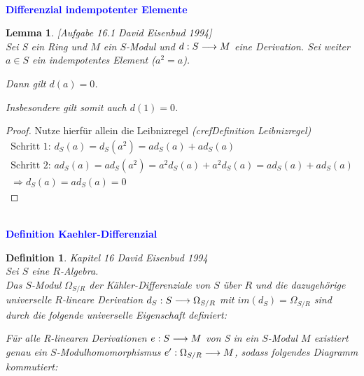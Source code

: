 \documentclass[10pt,a4paper]{report}
\newcommand{\ModulsOfDifferenzials}{David Eisenbud 1994}
\newcounter{Aussage}[chapter]
\newtheorem{lemma}[Aussage]{Lemma}
\newtheorem{definition}[Aussage]{Definition}
\newcommand{\functionfront}[3]{\nolinebreak{#1:#2 \longrightarrow #3}}
\newcommand{\divR}[2]{\Omega_{#1/#2}}
\newcommand{\divf}[1]{d_{#1}}
\newcommand{\immage}[1]{im(#1)}
\begin{document}
\ \\
\textcolor{blue}{\textbf{Differenzial indempotenter Elemente}}
\begin{lemma}\label{Differenzial indempotenter Elemente} \textit{[Aufgabe 16.1 \ModulsOfDifferenzials]} \\
Sei S ein Ring und $M$ ein $S$-Modul und $\functionfront{d}{S}{M}$ eine Derivation. Sei weiter $a \in S$ ein indempotentes Element ($a^2 = a$).
\begin{center}
Dann gilt $d(a) = 0$. 
\end{center}
Insbesondere gilt somit auch $d(1) = 0$.
\end{lemma}
\begin{proof}
Nutze hierfür allein die Leibnizregel \textit{(cref{Definition Leibnizregel})}
\begin{gather*}
\text{Schritt 1: } \divf{S}(a) = \divf{S}(a^2) = a\divf{S}(a) + a\divf{S}(a) \\
\text{Schritt 2: } a\divf{S}(a) = a\divf{S}(a^2) = a^2\divf{S}(a) + a^2\divf{S}(a) = a\divf{S}(a) + a\divf{S}(a)\\
\Rightarrow \divf{S}(a) = a\divf{S}(a) = 0
\end{gather*}
\end{proof}


\ \\
\textcolor{blue}{\textbf{Definition Kaehler-Differenzial}}
\begin{definition}\label{Definition Kaehler-Differenzial} \textit{Kapitel 16 \ModulsOfDifferenzials}\\
Sei $S$ eine $R$-Algebra.\\
Das $S$-Modul $\divR{S}{R}$ der Kähler-Differenziale von $S$ über $R$ und die dazugehörige universelle $R$-lineare Derivation $\functionfront{\divf{S}}{S}{\divR{S}{R}}$ mit $\immage{\divf{S}} = \divR{S}{R}$ sind durch die folgende universelle Eigenschaft definiert:
\begin{center}
Für alle R-linearen Derivationen $\functionfront{e}{S}{M}$ von S in ein $S$-Modul $M$ existiert genau ein $S$-Modulhomomorphismus $\functionfront{e'}{\divR{S}{R}}{M}$, sodass folgendes Diagramm kommutiert:\\
\end{center}
\end{definition}
\end{document}
